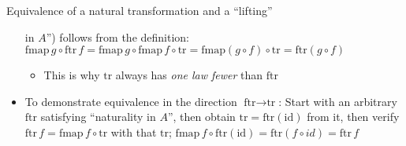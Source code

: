 \documentclass[english]{beamer}
\begin{document}
\begin{frame}{Equivalence of a natural transformation and a ``lifting''}
\begin{itemize}
in $A$'') follows from the definition: {\footnotesize{}$\text{fmap}\,g\circ\text{ftr}\,f=\text{fmap}\,g\circ\text{fmap}\,f\circ\text{tr}=\text{fmap}\left(g\circ f\right)\circ\text{tr}=\text{ftr}\left(g\circ f\right)$} 
\begin{itemize}
\item This is why {\footnotesize{}$\text{tr}$} always has \emph{one law
fewer} than {\footnotesize{}$\text{ftr}$}{\footnotesize\par}
\end{itemize}
\item To demonstrate equivalence in the direction {\footnotesize{}$\text{ftr}\rightarrow\text{tr}$}:
Start with an arbitrary {\footnotesize{}$\text{ftr}$} satisfying
``naturality in $A$'', then obtain {\footnotesize{}$\text{tr}=\text{ftr}\left(\text{id}\right)$}
from it, then verify {\footnotesize{}$\text{ftr}\,f=\text{fmap}\,f\circ\text{tr}$}
with that {\footnotesize{}$\text{tr}$}; {\footnotesize{}$\text{fmap}\,f\circ\text{ftr}\left(\text{id}\right)=\text{ftr}\left(f\circ id\right)=\text{ftr}\,f$}{\footnotesize\par}
\end{itemize}
\end{frame}
\end{document}
